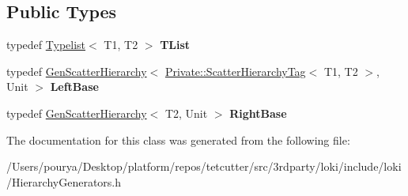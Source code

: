 \subsection*{Public Types}
\begin{DoxyCompactItemize}
\item 
\hypertarget{classLoki_1_1GenScatterHierarchy_3_01Typelist_3_01T1_00_01T2_01_4_00_01Unit_01_4_a766204c872420dd27af3867b451a2f83}{}typedef \hyperlink{structLoki_1_1Typelist}{Typelist}$<$ T1, T2 $>$ {\bfseries T\+List}\label{classLoki_1_1GenScatterHierarchy_3_01Typelist_3_01T1_00_01T2_01_4_00_01Unit_01_4_a766204c872420dd27af3867b451a2f83}

\item 
\hypertarget{classLoki_1_1GenScatterHierarchy_3_01Typelist_3_01T1_00_01T2_01_4_00_01Unit_01_4_a52f1525690866d87a845c3bde354774c}{}typedef \hyperlink{classLoki_1_1GenScatterHierarchy}{Gen\+Scatter\+Hierarchy}$<$ \hyperlink{structLoki_1_1Private_1_1ScatterHierarchyTag}{Private\+::\+Scatter\+Hierarchy\+Tag}$<$ T1, T2 $>$, Unit $>$ {\bfseries Left\+Base}\label{classLoki_1_1GenScatterHierarchy_3_01Typelist_3_01T1_00_01T2_01_4_00_01Unit_01_4_a52f1525690866d87a845c3bde354774c}

\item 
\hypertarget{classLoki_1_1GenScatterHierarchy_3_01Typelist_3_01T1_00_01T2_01_4_00_01Unit_01_4_a97f1faaf229caa59dbf4356031ff34f4}{}typedef \hyperlink{classLoki_1_1GenScatterHierarchy}{Gen\+Scatter\+Hierarchy}$<$ T2, Unit $>$ {\bfseries Right\+Base}\label{classLoki_1_1GenScatterHierarchy_3_01Typelist_3_01T1_00_01T2_01_4_00_01Unit_01_4_a97f1faaf229caa59dbf4356031ff34f4}

\end{DoxyCompactItemize}


The documentation for this class was generated from the following file\+:\begin{DoxyCompactItemize}
\item 
/\+Users/pourya/\+Desktop/platform/repos/tetcutter/src/3rdparty/loki/include/loki/Hierarchy\+Generators.\+h\end{DoxyCompactItemize}
